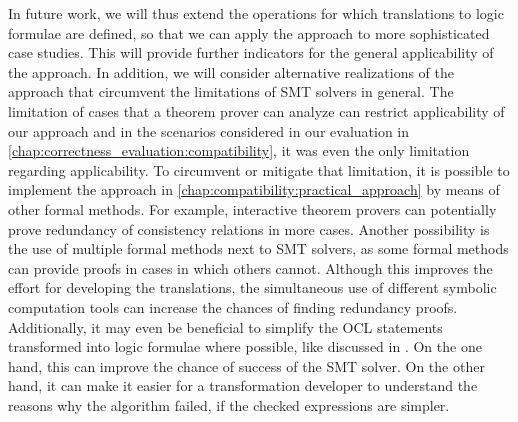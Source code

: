 In future work, we will thus extend the operations for which translations to logic formulae are defined, so that we can apply the approach to more sophisticated case studies.
This will provide further indicators for the general applicability of the approach.
%
In addition, we will consider alternative realizations of the approach that circumvent the limitations of \gls{SMT} solvers in general.
The limitation of cases that a theorem prover can analyze can restrict applicability of our approach and in the scenarios considered in our evaluation in \autoref{chap:correctness_evaluation:compatibility}, it was even the only limitation regarding applicability.
To circumvent or mitigate that limitation, it is possible to implement the approach in \autoref{chap:compatibility:practical_approach} by means of other formal methods. 
For example, interactive theorem provers can potentially prove redundancy of consistency relations in more cases. 
Another possibility is the use of multiple formal methods next to \gls{SMT} solvers, as some formal methods can provide proofs in cases in which others cannot.
Although this improves the effort for developing the translations, the simultaneous use of different symbolic computation tools can increase the chances of finding redundancy proofs.
Additionally, it may even be beneficial to simplify the \gls{OCL} statements transformed into logic formulae where possible, like discussed in \textcite{cuadrado2019OclOptimization-SoSym}.
On the one hand, this can improve the chance of success of the \gls{SMT} solver.
On the other hand, it can make it easier for a transformation developer to understand the reasons why the algorithm failed, if the checked expressions are simpler.



